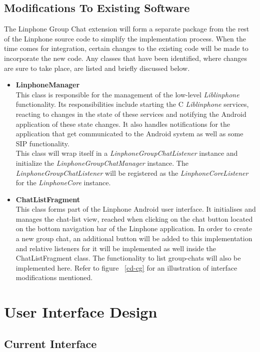 \documentclass[11pt]{article}
\begin{document}
\subsection{Modifications To Existing Software}
The Linphone Group Chat extension will form a separate package from the rest of the Linphone source code to simplify the implementation process. When the time comes for integration, certain changes to the existing code will be made to incorporate the new code. Any classes that have been identified, where changes are sure to take place, are listed and briefly discussed below.
\begin{itemize}
\item \textbf{LinphoneManager}\\
This class is responsible for the management of the low-level \textit{Liblinphone} functionality. Its responsibilities include starting the C \textit{Liblinphone} services, reacting to changes in the state of these services and notifying the Android application of these state changes. It also handles notifications for the application that get communicated to the Android system as well as some SIP functionality.\\
This class will wrap itself in a \textit{LinphoneGroupChatListener} instance and initialize the \textit{LinphoneGroupChatManager} instance. The \textit{LinphoneGroupChatListener} will be registered as the \textit{LinphoneCoreListener} for the \textit{LinphoneCore} instance.
\item \textbf{ChatListFragment}\\
This class forms part of the Linphone Android user interface. It initialises and manages the chat-list view, reached when clicking on the chat button located on the bottom navigation bar of the Linphone application. In order to create a new group chat, an additional button will be added to this implementation and relative listeners for it will be implemented as well inside the ChatListFragment class. The functionality to list group-chats will also be implemented here. Refer to figure ~\ref{cd-cg} for an illustration of interface modifications mentioned.

\end{itemize}

\section{User Interface Design}
\subsection{Current Interface}
\end{document}
